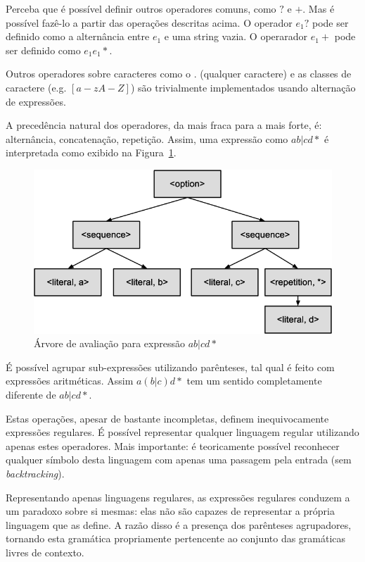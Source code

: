\documentclass[a4paper,12pt,oneside,onecolumn]{uerj}
\begin{document}
Perceba que é possível definir outros operadores comuns, como $?$ e $+$. Mas é possível fazê-lo a partir das operações descritas acima. O operador $e_1?$ pode ser definido como a alternância entre $e_1$ e uma string vazia. O operarador $e_1+$ pode ser definido como $e_1e_1*$.

Outros operadores sobre caracteres como o $.$ (qualquer caractere) e as classes de caractere (e.g. $[a-zA-Z]$) são trivialmente implementados usando alternação de expressões.

A precedência natural dos operadores, da mais fraca para a mais forte, é: alternância, concatenação, repetição. Assim, uma expressão como $ab|cd*$ é interpretada como exibido na Figura~\ref{fig:abcd_parse_tree}.

\begin{figure}[!htbp]
  \centering
  \includegraphics[scale=0.4]{figures/abcd_parse_tree.png}
  \caption{Árvore de avaliação para expressão $ab|cd*$}
  \label{fig:abcd_parse_tree}
\end{figure}

É possível agrupar sub-expressões utilizando parênteses, tal qual é feito com expressões aritméticas. Assim $a(b|c)d*$ tem um sentido completamente diferente de $ab|cd*$.

Estas operações, apesar de bastante incompletas, definem inequivocamente expressões regulares. É possível representar qualquer linguagem regular utilizando apenas estes operadores. Mais importante: é teoricamente possível reconhecer qualquer símbolo desta linguagem com apenas uma passagem pela entrada (sem \emph{backtracking}). 

Representando apenas linguagens regulares, as expressões regulares conduzem a um paradoxo sobre si mesmas: elas não são capazes de representar a própria linguagem que as define. A razão disso é a presença dos parênteses agrupadores, tornando esta gramática propriamente pertencente ao conjunto das gramáticas livres de contexto.
\end{document}
